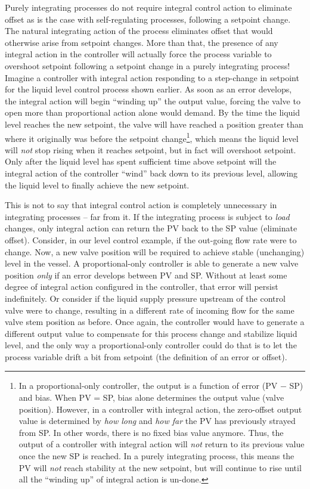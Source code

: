 Purely integrating processes do not require integral control action to eliminate offset as is the case with self-regulating processes, following a setpoint change.  The natural integrating action of the process eliminates offset that would otherwise arise from setpoint changes.  More than that, the presence of any integral action in the controller will actually force the process variable to overshoot setpoint following a setpoint change in a purely integrating process!  Imagine a controller with integral action responding to a step-change in setpoint for the liquid level control process shown earlier.  As soon as an error develops, the integral action will begin ``winding up'' the output value, forcing the valve to open more than proportional action alone would demand.  By the time the liquid level reaches the new setpoint, the valve will have reached a position greater than where it originally was before the setpoint change\footnote{In a proportional-only controller, the output is a function of error (PV $-$ SP) and bias.  When PV = SP, bias alone determines the output value (valve position).  However, in a controller with integral action, the zero-offset output value is determined by \textit{how long} and \textit{how far} the PV has previously strayed from SP.  In other words, there is no fixed bias value anymore.  Thus, the output of a controller with integral action will \textit{not} return to its previous value once the new SP is reached.  In a purely integrating process, this means the PV will \textit{not} reach stability at the new setpoint, but will continue to rise until all the ``winding up'' of integral action is un-done.}, which means the liquid level will \textit{not} stop rising when it reaches setpoint, but in fact will overshoot setpoint.  Only after the liquid level has spent sufficient time above setpoint will the integral action of the controller ``wind'' back down to its previous level, allowing the liquid level to finally achieve the new setpoint.

This is not to say that integral control action is completely unnecessary in integrating processes -- far from it.  If the integrating process is subject to \textit{load} changes, only integral action can return the PV back to the SP value (eliminate offset).  Consider, in our level control example, if the out-going flow rate were to change.  Now, a new valve position will be required to achieve stable (unchanging) level in the vessel.  A proportional-only controller is able to generate a new valve position \textit{only} if an error develops between PV and SP.  Without at least some degree of integral action configured in the controller, that error will persist indefinitely.  Or consider if the liquid supply pressure upstream of the control valve were to change, resulting in a different rate of incoming flow for the same valve stem position as before.  Once again, the controller would have to generate a different output value to compensate for this process change and stabilize liquid level, and the only way a proportional-only controller could do that is to let the process variable drift a bit from setpoint (the definition of an error or offset). 

